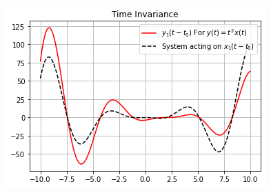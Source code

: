 \documentclass[journal,12pt,twocolumn]{IEEEtran}
\begin{document}
\begin{figure}[h]
\includegraphics[width = \columnwidth]{y1_t}
\end{figure}
\end{document}
